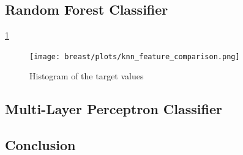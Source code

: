 \subsection{Random Forest Classifier}

\ref{fig:breast-rf-comparison}

\begin{figure}[H]
  \begin{center}
    \texttt{[image: breast/plots/knn\_feature\_comparison.png]}
    \caption{Histogram of the target values}
    \label{fig:breast-rf-comparison}
  \end{center}
\end{figure}

\subsection{Multi-Layer Perceptron Classifier}

\subsection{Conclusion}

